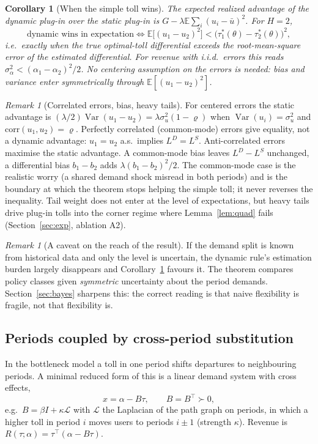 \documentclass[11pt]{article}
\newtheorem{corollary}[theorem]{Corollary}
\theoremstyle{definition}
\theoremstyle{remark}
\newtheorem{remark}[theorem]{Remark}
\newcommand{\E}{\mathbb{E}}
\newcommand{\Var}{\operatorname{Var}}
\begin{document}
\begin{corollary}[When the simple toll wins]\label{cor:cross}
The expected realized advantage of the dynamic plug-in over the static plug-in is $G-\lambda\E\sum_i(u_i-\bar u)^2$. For $H=2$,
\[\text{dynamic wins in expectation}\iff\E\big[(u_1-u_2)^2\big]<\big(\tau^*_1(\theta)-\tau^*_2(\theta)\big)^2,\]
i.e.\ exactly when the true optimal-toll differential exceeds the root-mean-square error of the estimated differential. For revenue with i.i.d.\ errors this reads $\sigma_\alpha^2<(\alpha_1-\alpha_2)^2/2$. No centering assumption on the errors is needed: bias and variance enter symmetrically through $\E[(u_1-u_2)^2]$.
\end{corollary}

\begin{remark}[Correlated errors, bias, heavy tails]\label{rem:corr}
For centered errors the static advantage is $(\lambda/2)\Var(u_1-u_2)=\lambda\sigma_u^2(1-\varrho)$ when $\Var(u_i)=\sigma_u^2$ and $\mathrm{corr}(u_1,u_2)=\varrho$. Perfectly correlated (common-mode) errors give equality, not a dynamic advantage: $u_1=u_2$ a.s.\ implies $L^D=L^S$. Anti-correlated errors maximise the static advantage. A common-mode bias leaves $L^D-L^S$ unchanged, a differential bias $b_1-b_2$ adds $\lambda(b_1-b_2)^2/2$. The common-mode case is the realistic worry (a shared demand shock misread in both periods) and is the boundary at which the theorem stops helping the simple toll; it never reverses the inequality. Tail weight does not enter at the level of expectations, but heavy tails drive plug-in tolls into the corner regime where Lemma~\ref{lem:quad} fails (Section~\ref{sec:exp}, ablation A2).
\end{remark}

\begin{remark}[A caveat on the reach of the result]\label{rem:caveat}
If the demand split is known from historical data and only the level is uncertain, the dynamic rule's estimation burden largely disappears and Corollary~\ref{cor:cross} favours it. The theorem compares policy classes given \emph{symmetric} uncertainty about the period demands. Section~\ref{sec:bayes} sharpens this: the correct reading is that naive flexibility is fragile, not that flexibility is.
\end{remark}

\subsection{Periods coupled by cross-period substitution}\label{sec:coupled}
In the bottleneck model a toll in one period shifts departures to neighbouring periods. A minimal reduced form of this is a linear demand system with cross effects,
\begin{equation}\label{eq:coupled}
x=\alpha-B\tau,\qquad B=B^\top\succ0,
\end{equation}
e.g.\ $B=\beta I+\kappa\mathcal L$ with $\mathcal L$ the Laplacian of the path graph on periods, in which a higher toll in period $i$ moves users to periods $i\pm1$ (strength $\kappa$). Revenue is $R(\tau;\alpha)=\tau^\top(\alpha-B\tau)$.
\end{document}
